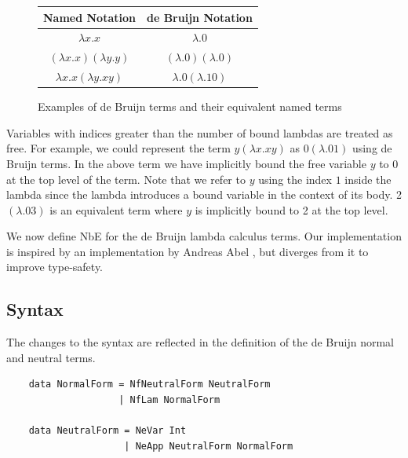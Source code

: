 \begin{figure}[h]
    \centering
    \begin{tabular}{ |c|c| } 
        \hline
        Named Notation & de Bruijn Notation \\
        \hline 
        $\lambda x.x$ & $\lambda . 0$ \\
        $(\lambda x. x)(\lambda y . y)$ & $(\lambda . 0)(\lambda . 0)$ \\
        $\lambda x. x (\lambda y. x y)$ & $\lambda . 0 (\lambda . 1 0 )$ \\
        \hline
    \end{tabular}
    \caption{Examples of de Bruijn terms and their equivalent named terms}
    \label{fig:deBruijnExamples}
\end{figure}




Variables with indices greater than the number of bound lambdas are treated as free. For example, we could represent the term $y (\lambda x.xy)$ as $0 (\lambda .01)$ using de Bruijn terms. In the above term we have implicitly bound the free variable $y$ to 0 at the top level of the term. Note that we refer to $y$ using the index $1$ inside the lambda since the lambda introduces a bound variable in the context of its body. 2 $(\lambda . 0 3)$ is an equivalent term where $y$ is implicitly bound to 2 at the top level.

We now define NbE for the de Bruijn lambda calculus terms. Our implementation is inspired by an implementation by Andreas Abel \cite{deBruijn}, but diverges from it to improve type-safety.

\subsection{Syntax}

The changes to the syntax are reflected in the definition of the de Bruijn normal and neutral terms. 

\begin{lstlisting}
    data NormalForm = NfNeutralForm NeutralForm
                    | NfLam NormalForm

    data NeutralForm = NeVar Int
                     | NeApp NeutralForm NormalForm
\end{lstlisting}


